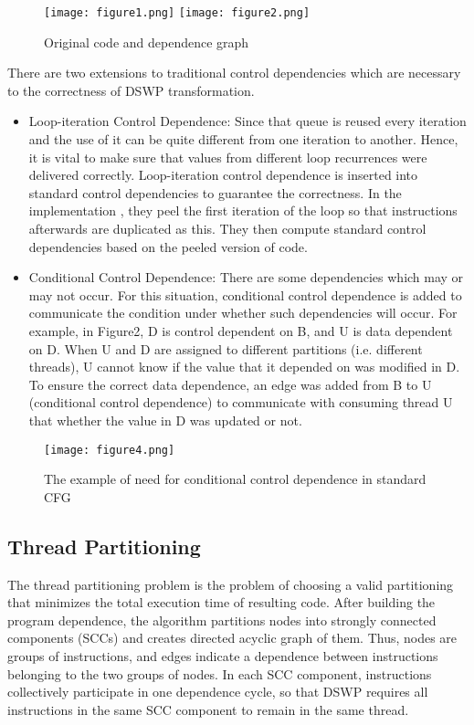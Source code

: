 \documentclass[letterpaper, 10 pt, conference]{ieeeconf}  %
\begin{document}
\begin{figure}[h!]
\texttt{[image: figure1.png]}
\texttt{[image: figure2.png]}
\caption{Original code and dependence graph}
  \centering
\end{figure}

There are two extensions to traditional control dependencies which are necessary to the correctness of DSWP transformation.
\begin{itemize}
\item Loop-iteration Control Dependence: 
Since that queue is reused every iteration and the use of it can be quite different from one iteration to another. Hence, it is vital to make sure that values from different loop recurrences were delivered correctly. Loop-iteration control dependence is inserted into standard control dependencies to guarantee the correctness. In the implementation \cite{c3}, they peel the first iteration of the loop so that instructions afterwards are duplicated as this. They then compute standard control dependencies based on the peeled version of code.
\end{itemize}

\begin{itemize}
\item Conditional Control Dependence: 
There are some dependencies which may or may not occur. For this situation, conditional control dependence is added to communicate the condition under whether such dependencies will occur. For example, in Figure2, D is control dependent on B, and U is data dependent on D. 
When U and D are assigned to different partitions (i.e. different threads), U cannot know if the value that it depended on was modified in D. To ensure the correct data dependence, an edge was added from B to U (conditional control dependence) to communicate with consuming thread U that whether the value in D was updated or not.
\end{itemize}

\begin{figure}[h!]
\texttt{[image: figure4.png]}
	\centering
\caption{The example of need for conditional control dependence in standard CFG}
  \centering
\end{figure}

\subsection{Thread Partitioning}
The thread partitioning problem is the problem of choosing a valid partitioning that minimizes the total execution time of resulting code. After building the program dependence, the algorithm partitions nodes into strongly connected components (SCCs) and creates directed acyclic graph of them. Thus, nodes are groups of instructions, and edges indicate a dependence between instructions belonging to the two groups of nodes. In each SCC component, instructions collectively participate in one dependence cycle, so that DSWP requires all instructions in the same SCC component to remain in the same thread.
\end{document}

